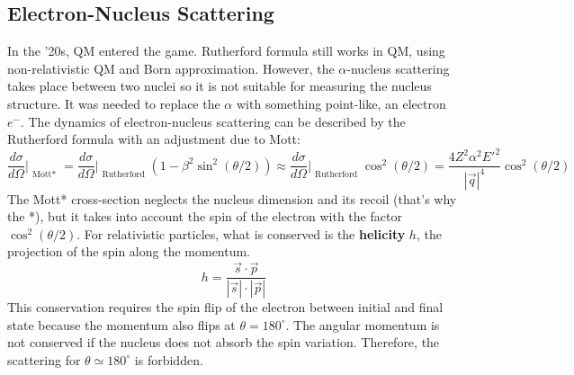 \documentclass[10.75pt,a4paper,openright,bottom=2cm]{article}
\begin{document}
\subsection{Electron-Nucleus Scattering}
In the '20s, QM entered the game. Rutherford formula still works in QM, using non-relativistic QM and Born approximation. However, the $\alpha$-nucleus scattering takes place between two nuclei so it is not suitable for measuring the nucleus structure. It was needed to replace the $\alpha$ with something point-like, an electron $e^-$. The dynamics of electron-nucleus scattering can be described by the Rutherford formula with an adjustment due to Mott:
\[
\frac{d\sigma}{d\Omega}\Bigr|_{\substack{\text{Mott*}}}=\frac{d\sigma}{d\Omega}\Bigr|_{\substack{\text{Rutherford}}}\left(1-\beta^2\sin^2(\theta/2)\right)\approx\frac{d\sigma}{d\Omega}\Bigr|_{\substack{\text{Rutherford}}}\cos^2(\theta/2)=\frac{4Z^2\alpha^2E'^2}{|\Vec{q}|^4}\cos^2(\theta/2)
\]
The Mott* cross-section neglects the nucleus dimension and its recoil (that's why the *), but it takes into account the spin of the electron with the factor $\cos^2(\theta/2)$. For relativistic particles, what is conserved is the \textbf{helicity} $h$, the projection of the spin along the momentum. 
\[
h=\frac{\Vec{s}\cdot\Vec{p}}{|\Vec{s}|\cdot|\Vec{p}|}
\]
This conservation requires the spin flip of the electron between initial and final state because the momentum also flips at $\theta=180^\circ$. The angular momentum is not conserved if the nucleus does not absorb the spin variation. Therefore, the scattering for $\theta\simeq180^\circ$ is forbidden.
\end{document}
